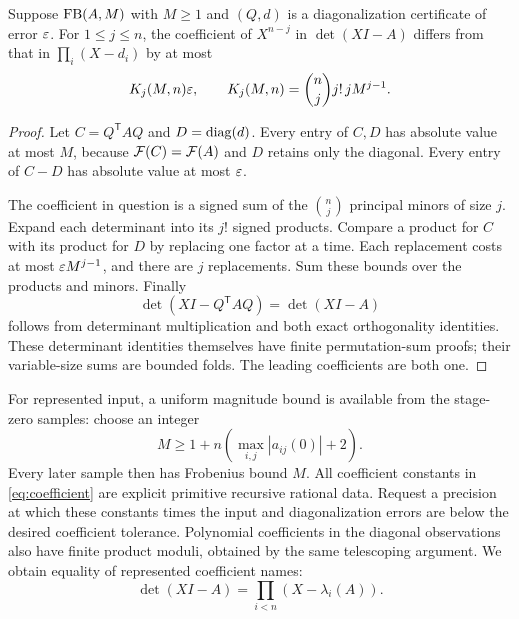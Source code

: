 \begin{lemma}
\label{lem:coeff}
Suppose $\operatorname{FB}(A,M)$ with $M\ge1$ and $(Q,d)$ is a diagonalization certificate of error $\varepsilon$. For $1\le j\le n$, the coefficient of $X^{n-j}$ in $\det(XI-A)$ differs from that in $\prod_i(X-d_i)$ by at most
\begin{equation}
 K_j(M,n)\varepsilon,
 \qquad K_j(M,n)=\binom nj j!\,j M^{j-1}. \label{eq:coefficient}
\end{equation}
\end{lemma}
\begin{proof}
Let $C=Q^{\mathsf T}AQ$ and $D=\operatorname{diag}(d)$. Every entry of $C,D$ has absolute value at most $M$, because $\mathcal F(C)=\mathcal F(A)$ and $D$ retains only the diagonal. Every entry of $C-D$ has absolute value at most $\varepsilon$.

The coefficient in question is a signed sum of the $\binom nj$ principal minors of size $j$. Expand each determinant into its $j!$ signed products. Compare a product for $C$ with its product for $D$ by replacing one factor at a time. Each replacement costs at most $\varepsilon M^{j-1}$, and there are $j$ replacements. Sum these bounds over the products and minors. Finally
\[
 \det(XI-Q^{\mathsf T}AQ)=\det(XI-A)
\]
follows from determinant multiplication and both exact orthogonality identities. These determinant identities themselves have finite permutation-sum proofs; their variable-size sums are bounded folds. The leading coefficients are both one.
\end{proof}

For represented input, a uniform magnitude bound is available from the stage-zero samples: choose an integer
\[
 M\ge1+n\left(\max_{i,j}|a_{ij}(0)|+2\right).
\]
Every later sample then has Frobenius bound $M$. All coefficient constants in \eqref{eq:coefficient} are explicit primitive recursive rational data. Request a precision at which these constants times the input and diagonalization errors are below the desired coefficient tolerance. Polynomial coefficients in the diagonal observations also have finite product moduli, obtained by the same telescoping argument. We obtain equality of represented coefficient names:
\begin{equation}
 \det(XI-A)=\prod_{i<n}(X-\lambda_i(A)). \label{eq:factorization}
\end{equation}

